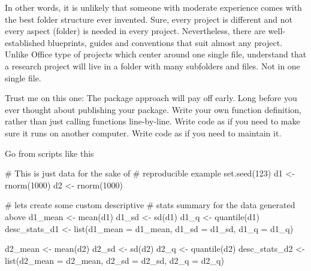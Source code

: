 \documentclass[
  12pt,
  letterpaper,
]{krantz}
\newenvironment{Shaded}{\begin{snugshade}}{\end{snugshade}}
\newcommand{\AttributeTok}[1]{\textcolor[rgb]{0.40,0.45,0.13}{#1}}
\newcommand{\CommentTok}[1]{\textcolor[rgb]{0.37,0.37,0.37}{#1}}
\newcommand{\DecValTok}[1]{\textcolor[rgb]{0.68,0.00,0.00}{#1}}
\newcommand{\FunctionTok}[1]{\textcolor[rgb]{0.28,0.35,0.67}{#1}}
\newcommand{\NormalTok}[1]{\textcolor[rgb]{0.00,0.23,0.31}{#1}}
\newcommand{\OtherTok}[1]{\textcolor[rgb]{0.00,0.23,0.31}{#1}}
\begin{document}
In other words, it is unlikely that someone with moderate experience
comes with the best folder structure ever invented. Sure, every project
is different and not every aspect (folder) is needed in every project.
Nevertheless, there are well-established blueprints, guides and
conventions that suit almost any project. Unlike Office type of projects
which center around one single file, understand that a research project
will live in a folder with many subfolders and files. Not in one single
file.

Trust me on this one: The package approach will pay off early. Long
before you ever thought about publishing your package. Write your own
function definition, rather than just calling functions line-by-line.
Write code as if you need to make sure it runs on another computer.
Write code as if you need to maintain it.

Go from scripts like this

\begin{Shaded}
\begin{Highlighting}[]
\CommentTok{\# This is just data for the sake of }
\CommentTok{\# reproducible example}
\FunctionTok{set.seed}\NormalTok{(}\DecValTok{123}\NormalTok{)}
\NormalTok{d1 }\OtherTok{\textless{}{-}} \FunctionTok{rnorm}\NormalTok{(}\DecValTok{1000}\NormalTok{)}
\NormalTok{d2 }\OtherTok{\textless{}{-}} \FunctionTok{rnorm}\NormalTok{(}\DecValTok{1000}\NormalTok{)}

\CommentTok{\# let\textquotesingle{}s create some custom descriptive}
\CommentTok{\# stats summary for the data generated above}
\NormalTok{d1\_mean }\OtherTok{\textless{}{-}} \FunctionTok{mean}\NormalTok{(d1)}
\NormalTok{d1\_sd }\OtherTok{\textless{}{-}} \FunctionTok{sd}\NormalTok{(d1)}
\NormalTok{d1\_q }\OtherTok{\textless{}{-}} \FunctionTok{quantile}\NormalTok{(d1)}
\NormalTok{desc\_stats\_d1 }\OtherTok{\textless{}{-}} \FunctionTok{list}\NormalTok{(}\AttributeTok{d1\_mean =}\NormalTok{ d1\_mean,}
                      \AttributeTok{d1\_sd =}\NormalTok{ d1\_sd,}
                      \AttributeTok{d1\_q =}\NormalTok{ d1\_q)}

\NormalTok{d2\_mean }\OtherTok{\textless{}{-}} \FunctionTok{mean}\NormalTok{(d2)}
\NormalTok{d2\_sd }\OtherTok{\textless{}{-}} \FunctionTok{sd}\NormalTok{(d2)}
\NormalTok{d2\_q }\OtherTok{\textless{}{-}} \FunctionTok{quantile}\NormalTok{(d2)}
\NormalTok{desc\_stats\_d2 }\OtherTok{\textless{}{-}} \FunctionTok{list}\NormalTok{(}\AttributeTok{d2\_mean =}\NormalTok{ d2\_mean,}
                      \AttributeTok{d2\_sd =}\NormalTok{ d2\_sd,}
                      \AttributeTok{d2\_q =}\NormalTok{ d2\_q)}
\end{Highlighting}
\end{Shaded}
\end{document}
